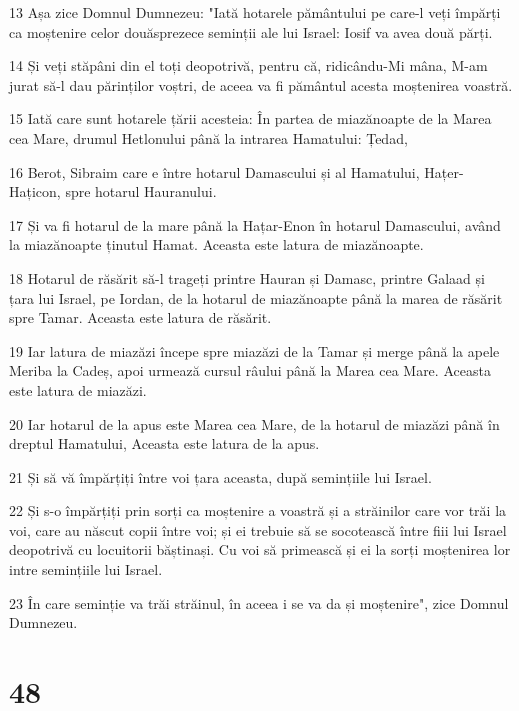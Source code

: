 \par 13 Așa zice Domnul Dumnezeu: "Iată hotarele pământului pe care-l veți împărți ca moștenire celor douăsprezece seminții ale lui Israel: Iosif va avea două părți.
\par 14 Și veți stăpâni din el toți deopotrivă, pentru că, ridicându-Mi mâna, M-am jurat să-l dau părinților voștri, de aceea va fi pământul acesta moștenirea voastră.
\par 15 Iată care sunt hotarele țării acesteia: În partea de miazănoapte de la Marea cea Mare, drumul Hetlonului până la intrarea Hamatului: Țedad,
\par 16 Berot, Sibraim care e între hotarul Damascului și al Hamatului, Hațer-Hațicon, spre hotarul Hauranului.
\par 17 Și va fi hotarul de la mare până la Hațar-Enon în hotarul Damascului, având la miazănoapte ținutul Hamat. Aceasta este latura de miazănoapte.
\par 18 Hotarul de răsărit să-l trageți printre Hauran și Damasc, printre Galaad și țara lui Israel, pe Iordan, de la hotarul de miazănoapte până la marea de răsărit spre Tamar. Aceasta este latura de răsărit.
\par 19 Iar latura de miazăzi începe spre miazăzi de la Tamar și merge până la apele Meriba la Cadeș, apoi urmează cursul râului până la Marea cea Mare. Aceasta este latura de miazăzi.
\par 20 Iar hotarul de la apus este Marea cea Mare, de la hotarul de miazăzi până în dreptul Hamatului, Aceasta este latura de la apus.
\par 21 Și să vă împărțiți între voi țara aceasta, după semințiile lui Israel.
\par 22 Și s-o împărțiți prin sorți ca moștenire a voastră și a străinilor care vor trăi la voi, care au născut copii între voi; și ei trebuie să se socotească între fiii lui Israel deopotrivă cu locuitorii băștinași. Cu voi să primească și ei la sorți moștenirea lor intre semințiile lui Israel.
\par 23 În care seminție va trăi străinul, în aceea i se va da și moștenire", zice Domnul Dumnezeu.

\chapter{48}

